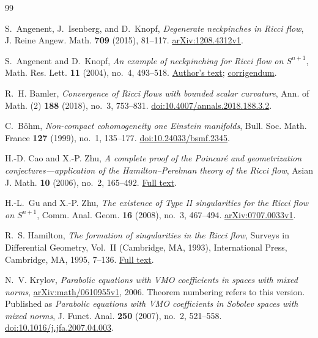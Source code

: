 \begin{thebibliography}{99}
\raggedright

S.~Angenent, J.~Isenberg, and D.~Knopf,
\emph{Degenerate neckpinches in Ricci flow},
J. Reine Angew. Math. \textbf{709} (2015), 81--117.
\href{https://arxiv.org/abs/1208.4312v1}{arXiv:1208.4312v1}.

S.~Angenent and D.~Knopf,
\emph{An example of neckpinching for Ricci flow on \(S^{n+1}\)},
Math. Res. Lett. \textbf{11} (2004), no.~4, 493--518.
\href{https://web.ma.utexas.edu/users/danknopf/Neckpinch.pdf}{Author's text};
\href{https://web.ma.utexas.edu/users/danknopf/Corrigendum.pdf}{corrigendum}.

R.~H. Bamler,
\emph{Convergence of Ricci flows with bounded scalar curvature},
Ann. of Math. (2) \textbf{188} (2018), no.~3, 753--831.
\href{https://doi.org/10.4007/annals.2018.188.3.2}{doi:10.4007/annals.2018.188.3.2}.

C.~B\"ohm,
\emph{Non-compact cohomogeneity one Einstein manifolds},
Bull. Soc. Math. France \textbf{127} (1999), no.~1, 135--177.
\href{https://doi.org/10.24033/bsmf.2345}{doi:10.24033/bsmf.2345}.

H.-D. Cao and X.-P. Zhu,
\emph{A complete proof of the Poincar\'e and geometrization conjectures---application
of the Hamilton--Perelman theory of the Ricci flow},
Asian J. Math. \textbf{10} (2006), no.~2, 165--492.
\href{https://www.renyi.hu/~stipsicz/perelman/cao-zhu.pdf}{Full text}.

H.-L.~Gu and X.-P. Zhu,
\emph{The existence of Type II singularities for the Ricci flow on
\(S^{n+1}\)},
Comm. Anal. Geom. \textbf{16} (2008), no.~3, 467--494.
\href{https://arxiv.org/abs/0707.0033v1}{arXiv:0707.0033v1}.

R.~S. Hamilton,
\emph{The formation of singularities in the Ricci flow},
Surveys in Differential Geometry, Vol.~II (Cambridge, MA, 1993),
International Press, Cambridge, MA, 1995, 7--136.
\href{https://intlpress.com/site/pub/files/_fulltext/journals/sdg/1993/0002/0001/SDG-1993-0002-0001-a002.pdf}{Full text}.

N.~V. Krylov,
\emph{Parabolic equations with VMO coefficients in spaces with mixed norms},
\href{https://arxiv.org/abs/math/0610955v1}{arXiv:math/0610955v1}, 2006.
Theorem numbering refers to this version.
Published as \emph{Parabolic equations with VMO coefficients in Sobolev
spaces with mixed norms}, J. Funct. Anal. \textbf{250} (2007), no.~2,
521--558.
\href{https://doi.org/10.1016/j.jfa.2007.04.003}{doi:10.1016/j.jfa.2007.04.003}.


\end{thebibliography}
